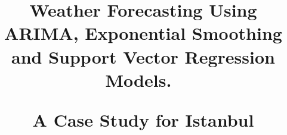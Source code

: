 \documentclass[conference,letterpaper]{IEEEtran}
\begin{document}
\title{Weather Forecasting Using ARIMA, Exponential Smoothing and Support Vector Regression Models.\

 A Case Study for Istanbul}





%

% 
\author{


}


\maketitle
\thispagestyle{plain}
\pagestyle{plain}
\end{document}
